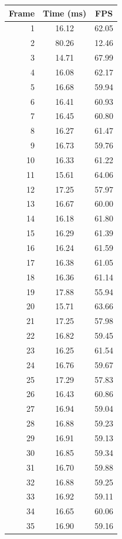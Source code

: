 \begin{table}[htbp]
  \centering\small
  \setlength{\tabcolsep}{8pt}
  \begin{tabular}{@{}rcc@{}}
    \toprule
    \textbf{Frame} & \textbf{Time (ms)} & \textbf{FPS} \\
    \midrule
    1 & 16.12 & 62.05 \\
    2 & 80.26 & 12.46 \\
    3 & 14.71 & 67.99 \\
    4 & 16.08 & 62.17 \\
    5 & 16.68 & 59.94 \\
    6 & 16.41 & 60.93 \\
    7 & 16.45 & 60.80 \\
    8 & 16.27 & 61.47 \\
    9 & 16.73 & 59.76 \\
    10 & 16.33 & 61.22 \\
    11 & 15.61 & 64.06 \\
    12 & 17.25 & 57.97 \\
    13 & 16.67 & 60.00 \\
    14 & 16.18 & 61.80 \\
    15 & 16.29 & 61.39 \\
    16 & 16.24 & 61.59 \\
    17 & 16.38 & 61.05 \\
    18 & 16.36 & 61.14 \\
    19 & 17.88 & 55.94 \\
    20 & 15.71 & 63.66 \\
    21 & 17.25 & 57.98 \\
    22 & 16.82 & 59.45 \\
    23 & 16.25 & 61.54 \\
    24 & 16.76 & 59.67 \\
    25 & 17.29 & 57.83 \\
    26 & 16.43 & 60.86 \\
    27 & 16.94 & 59.04 \\
    28 & 16.88 & 59.23 \\
    29 & 16.91 & 59.13 \\
    30 & 16.85 & 59.34 \\
    31 & 16.70 & 59.88 \\
    32 & 16.88 & 59.25 \\
    33 & 16.92 & 59.11 \\
    34 & 16.65 & 60.06 \\
    35 & 16.90 & 59.16 \\

\end{tabular}
\end{table}
